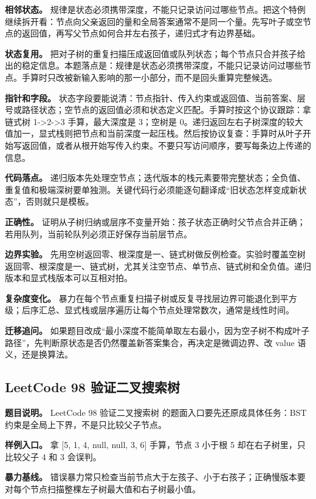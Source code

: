 \textbf{相邻状态。} 规律是状态必须携带深度，不能只记录访问过哪些节点。把这个特例继续拆开看：节点向父亲返回的量和全局答案通常不是同一个量。先写叶子或空节点的返回值，再写父节点如何合并左右孩子，递归式才有边界基础。

\textbf{状态复用。} 把对子树的重复扫描压成返回值或队列状态；每个节点只合并孩子给出的稳定信息。本题落点是：规律是状态必须携带深度，不能只记录访问过哪些节点。手算时只改被新输入影响的那一小部分，而不是回头重算完整候选。

\textbf{指针和字段。} 状态字段要能说清：节点指针、传入约束或返回值、当前答案、层号或路径状态；空节点的返回值必须和状态定义匹配。手算时按这个协议跟踪：拿链式树 1->2->3 手算，最大深度是 3；空树是 0。递归返回左右子树深度的较大值加一，显式栈则把节点和当前深度一起压栈。然后按协议复查：手算时从叶子开始写返回值，或者从根开始写传入约束。不要只写访问顺序，要写每条边上传递的信息。

\textbf{代码落点。} 递归版本先处理空节点；迭代版本的栈元素要带完整状态；全负值、重复值和极端深树要单独测。关键代码行必须能逐句翻译成“旧状态怎样变成新状态”，否则就只是模板。

\textbf{正确性。} 证明从子树归纳或层序不变量开始：孩子状态正确时父节点合并正确；若用队列，当前轮队列必须正好保存当前层节点。

\textbf{边界实验。} 先用空树返回零、根深度是一、链式树做反例检查。实验时覆盖空树返回零、根深度是一、链式树，尤其关注空节点、单节点、链式树和全负值。递归版本和显式栈版本可以互相对拍。

\textbf{复杂度变化。} 暴力在每个节点重复扫描子树或反复寻找层边界可能退化到平方级；后序汇总、显式栈或层序遍历让每个节点处理常数次，通常是线性时间。

\textbf{迁移追问。} 如果题目改成“最小深度不能简单取左右最小，因为空子树不构成叶子路径”，先判断原状态是否仍然覆盖新答案集合，再决定是微调边界、改 value 语义，还是换算法。

\subsection{LeetCode 98 验证二叉搜索树}

\textbf{题目说明。} LeetCode 98 验证二叉搜索树 的题面入口要先还原成具体任务：BST 约束是全局上下界，不是只比较父子节点。

\textbf{样例入口。} 拿 [5, 1, 4, null, null, 3, 6] 手算，节点 3 小于根 5 却在右子树里，只比较父子 4 和 3 会误判。

\textbf{暴力基线。} 错误暴力常只检查当前节点大于左孩子、小于右孩子；正确慢版本要对每个节点扫描整棵左子树最大值和右子树最小值。

